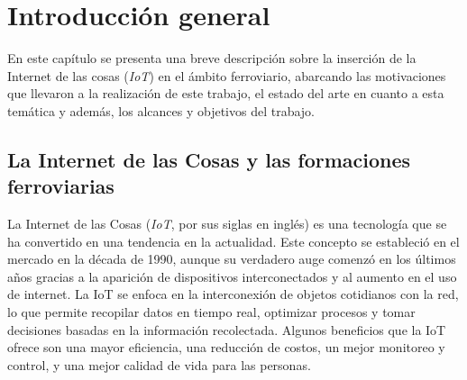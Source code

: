 
\chapter{Introducción general} %

\label{Chapter1} %
\label{IntroGeneral}


\newcommand{\keyword}[1]{\textbf{#1}}
\newcommand{\tabhead}[1]{\textbf{#1}}
\newcommand{\code}[1]{\texttt{#1}}
\newcommand{\file}[1]{\texttt{\bfseries#1}}
\newcommand{\option}[1]{\texttt{\itshape#1}}
\newcommand{\grados}{$^{\circ}$}



En este capítulo se presenta una breve descripción sobre la inserción de la Internet de las cosas (\textit{IoT}) \citep{iot} en el ámbito ferroviario, abarcando las motivaciones que llevaron a la realización de este trabajo, el estado del arte en cuanto a esta temática y además, los alcances y objetivos del trabajo.



\section{La Internet de las Cosas y las formaciones ferroviarias}

La Internet de las Cosas (\textit{IoT}, por sus siglas en inglés) es una tecnología que se ha convertido en una tendencia en la actualidad. Este concepto se estableció en el mercado en la década de 1990, aunque su verdadero auge comenzó en los últimos años gracias a la aparición de dispositivos interconectados y al aumento en el uso de internet. La IoT se enfoca en la interconexión de objetos cotidianos con la red, lo que permite recopilar datos en tiempo real, optimizar procesos y tomar decisiones basadas en la información recolectada. Algunos beneficios que la IoT ofrece son una mayor eficiencia, una reducción de costos, un mejor monitoreo y control, y una mejor calidad de vida para las personas.

